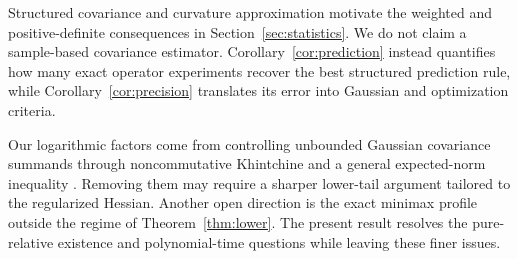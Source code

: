 \documentclass[twoside]{article}
\begin{document}
Structured covariance and curvature approximation motivate the weighted and positive-definite consequences in Section~\ref{sec:statistics}. We do not claim a sample-based covariance estimator. Corollary~\ref{cor:prediction} instead quantifies how many exact operator experiments recover the best structured prediction rule, while Corollary~\ref{cor:precision} translates its error into Gaussian and optimization criteria.

Our logarithmic factors come from controlling unbounded Gaussian covariance summands through noncommutative Khintchine and a general expected-norm inequality \citep{buchholz2001operator,tropp2015expected}. Removing them may require a sharper lower-tail argument tailored to the regularized Hessian. Another open direction is the exact minimax profile outside the regime of Theorem~\ref{thm:lower}. The present result resolves the pure-relative existence and polynomial-time questions while leaving these finer issues.



\clearpage
\end{document}
